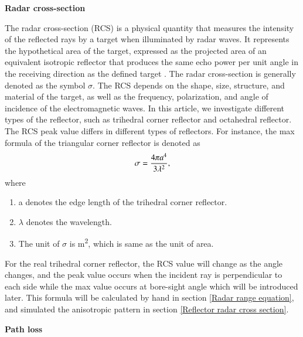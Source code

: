 \documentclass[12pt,DIV14,BCOR12mm,a4paper,footinclude=false,headinclude,parskip=half-,twoside,openright,cleardoublepage=empty,toc=index,bibliography=totoc,listof=totoc]{scrreprt}
\numberwithin{equation}{chapter}
\begin{document}
\begin{spacing}{1.5}
\textbf{\large{Radar cross-section}}
\end{spacing}

The radar cross-section (RCS) is a physical quantity that measures the intensity of the reflected rays by a target when illuminated by radar waves. It represents the hypothetical area of the target, expressed as the projected area of an equivalent isotropic reflector that produces the same echo power per unit angle in the receiving direction as the defined target \cite{rcs}. The radar cross-section is generally denoted as the symbol $\sigma$. The RCS depends on the shape, size, structure, and material of the target, as well as the frequency, polarization, and angle of incidence of the electromagnetic waves. In this article, we investigate different types of the reflector, such as trihedral corner reflector and octahedral reflector. The RCS peak value differs in different types of reflectors. For instance, the max formula of the triangular corner reflector \cite{doerry_reflectors_2014} is denoted as
\begin{equation}
    \centering
    \sigma = \frac{4 \pi a^{4}}{3 \lambda^{2}},
    \label{radar cross-section formula}
\end{equation}
where
\begin{enumerate}[label=\textbullet]
    \item a denotes the edge length of the trihedral corner reflector.
    \item $\lambda$ denotes the wavelength.
    \item The unit of $\sigma$ is m\textsuperscript{2}, which is same as the unit of area.
\end{enumerate}
For the real trihedral corner reflector, the RCS value will change as the angle changes, and the peak value occurs when the incident ray is perpendicular to each side while the max value occurs at bore-sight angle which will be introduced later. This formula will be calculated by hand in section \ref{Radar range equation}, and simulated the anisotropic pattern in section \ref{Reflector radar cross section}.

\begin{spacing}{1.5}
\textbf{\large{Path loss}}
\end{spacing}
\end{document}
